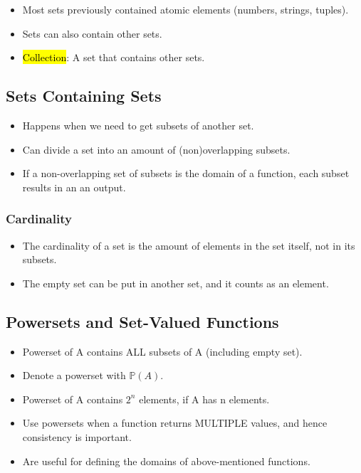 \begin{itemize}
    \item Most sets previously contained atomic elements (numbers, strings, tuples).
    \item Sets can also contain other sets.
    \item \hl{Collection}: A set that contains other sets.
\end{itemize}

\subsection{Sets Containing Sets}
\begin{itemize}
    \item Happens when we need to get subsets of another set.
    \item Can divide a set into an amount of (non)overlapping subsets.
    \item If a non-overlapping set of subsets is the domain of a function, each subset results in an an output. 
\end{itemize}

\subsubsection{Cardinality}
\begin{itemize}
    \item The cardinality of a set is the amount of elements in the set itself, not in its subsets.
    \item The empty set can be put in another set, and it counts as an element.
\end{itemize}

\subsection{Powersets and Set-Valued Functions}
\begin{itemize}
    \item Powerset of A contains ALL subsets of A (including empty set).
    \item Denote a powerset with $\mathbb{P}(A)$.
    \item Powerset of A contains $2^n$ elements, if A has n elements.
    \item Use powersets when a function returns MULTIPLE values, and hence consistency is important.
    \item Are useful for defining the domains of above-mentioned functions.
\end{itemize}


